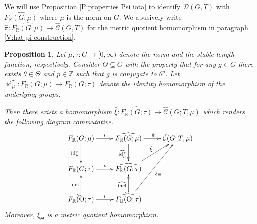 \documentclass[12pt]{amsart}
\newtheorem{prop}{Proposition}[section]
\theoremstyle{definition}
\def\RR{\ensuremath{\mathbb{R}}}
\def\ZZ{\ensuremath{\mathbb{Z}}}
\newcommand{\OP}[1]{\operatorname{#1}}
\def\Free{F}
\def\D{\mathcal{D}}
\def\tC{\hat{\mathcal{C}}}
\def\tD{\hat{\D}}
\begin{document}





We will use Proposition \ref{P:properties Psi iota} to identify $\tD(G,T)$ with $\widehat{\Free_\RR(G;\mu)}$  where $\mu$ is the norm on $G$.
We abusively write $\hat{\pi} \colon \widehat{\Free_\RR(G;\mu)} \to \tC(G,T)$ for the metric quotient homomorphism in paragraph \ref{V:hat pi construction}.


\begin{prop}\label{prop:quotient of tau}
Let $\mu,\tau \colon G \to [0,\infty)$ denote the norm and the stable length function, respectively.
Consider $\Theta \subseteq G$ with the property that for any $g \in G$ there exists $\theta \in \Theta$ and $p \in \ZZ$ such that $g$ is conjugate to $\theta^p$.
Let $\OP{id}^\tau_\mu \colon \Free_\RR(G;\mu) \to \Free_\RR(G;\tau)$ denote the identity homomorphism of the underlying groups.

Then there exists a homomorphism $\hat{\xi} \colon \widehat{\Free_\RR(G;\tau)} \to \tC(G;T,\mu)$ which renders the following diagram commutative.
\[
\xymatrix{
{\Free}_\RR(G;\mu) \ar[r]^\iota \ar[d]_{\OP{id}^\tau_\mu} &
\widehat{\Free_\RR(G;\mu)} \ar[d]_{\widehat{\OP{id}^\tau_\mu}} \ar[r]^{\hat{\pi}} 
&
\tC(G;T,\mu) 
\\
{\Free}_\RR(G;\tau) \ar[r]^\iota  &
\widehat{\Free_\RR(G;\tau)} \ar[ur]^{\hat{\xi}} 
\\
{\Free}_\RR(\Theta;\tau) \ar[r]^\iota  \ar@{^(->}[u]^{\OP{incl}} &
\widehat{\Free_\RR(\Theta;\tau)} \ar@{^(->}[u]^{\widehat{\OP{incl}}} \ar[uur]_{\hat{\xi}_\Theta}
}
\]
Moreover, $\xi_\Theta$ is a metric quotient homomorphism.
\end{prop}
\end{document}
